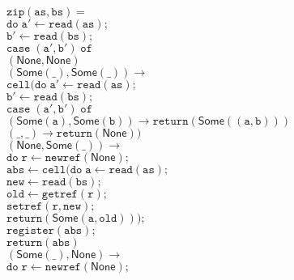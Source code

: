 \documentclass[nocopyrightspace,preprint]{sigplanconf}
\newcommand{\term}[1]{\ensuremath{\mathtt{{#1}}}}
\newcommand{\None}{\mathsf{None}}
\newcommand{\Some}[1]{\mathsf{Some}({#1})}
\begin{document}
\begin{figure}
{\small
\begin{tabbing}
\term{zip(as, bs) =} \\
\;\;\= \term{do\;}\=\term{a' \leftarrow read(as);} \\
\>              \>\term{b' \leftarrow read(bs);} \\
\>              \>\term{case \;(a',b')\;of}\\ 
\>           \>\;\;\=\term{(\None, \None)} \\
\>           \>    \>\term{(\Some{\_}, \Some{\_}) \to} \\
\>           \>    \> \qquad \term{cell(do\;}\=\term{a' \leftarrow read(as);} \\
\>           \>    \>                      \>\term{b' \leftarrow read(bs);} \\
\>           \>    \>                      \>\term{case \;(a',b')\; of} \\
\>           \>    \>                      \>\;\;\=\term{(\Some{a}, \Some{b}) \to return(\Some{(a,b)})} \\
\>           \>    \>                      \>\;\;\=\term{(\_, \_) \to return(\None))} \\
\>           \>    \>\term{(\None, \Some{\_}) \to}\\
\>           \>    \> \qquad\term{do\;}\=
                                      \term{r \leftarrow newref(\None);} \\
\>           \>    \>               \>\term{abs \leftarrow cell(do\;}\=\term{a \leftarrow read(as);} \\
\>           \>    \>               \>                               \>\term{new \leftarrow read(bs);} \\
\>           \>    \>               \>                               \>\term{old \leftarrow getref(r);}\\
\>           \>    \>               \>                               \>\term{setref(r, new);}\\
\>           \>    \>               \>                               \>\term{return(\Some{a,old}));}\\
\>           \>    \>               \>\term{register(abs);} \\
\>           \>    \>               \>\term{return(abs)} \\
\>           \>    \>\term{(\Some{\_}, \None) \to}\\
\>           \>    \> \qquad\term{do\;}\=
                                      \term{r \leftarrow newref(\None);} \\

\end{tabbing}}
\end{figure}
\end{document}
